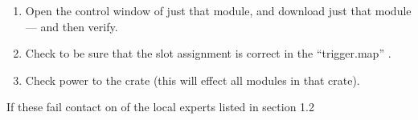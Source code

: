 \begin{enumerate}

	\item Open the control window of just that module,  and download just that module ---  and then verify.

	\item Check to be sure that the slot assignment is correct in the ``trigger.map'' .

	\item Check power to the crate (this will effect all modules in that crate).

\end{enumerate}
 
	If these fail contact on of the local experts listed in section 1.2


%

